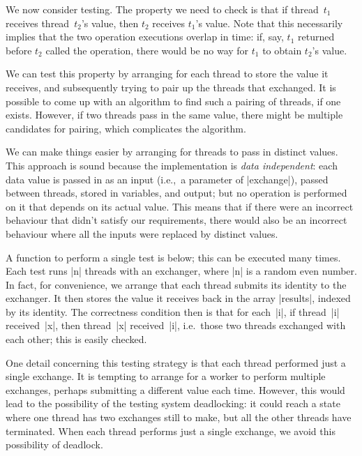 
We now consider testing.  The property we need to check is that if
thread~$t_1$ receives thread~$t_2$'s value, then $t_2$ receives $t_1$'s value.
Note that this necessarily implies that the two operation executions overlap
in time: if, say, $t_1$ returned before $t_2$ called the operation, there
would be no way for $t_1$ to obtain $t_2$'s value.  

We can test this property by arranging for each thread to store the value it
receives, and subsequently trying to pair up the threads that exchanged.  It
is possible to come up with an algorithm to find such a pairing of threads, if
one exists.
However, if two threads pass in the same value, there might be multiple
candidates for pairing, which complicates the algorithm.

We can make things easier by arranging for threads to pass in distinct values.
This approach is sound because the implementation is \emph{data independent}:
each data value is passed in as an input (i.e.,~a parameter of |exchange|),
passed between threads, stored in variables, and output; but no operation is
performed on it that depends on its actual value.  This means that if there
were an incorrect behaviour that didn't satisfy our requirements, there would
also be an incorrect behaviour where all the inputs were replaced by distinct
values.

A function to perform a single test is below; this can be executed many times.
Each test runs |n| threads with an exchanger, where |n| is a random even
number.  In fact, for convenience, we arrange that each thread submits its
identity to the exchanger.  It then stores the value it receives back in the
array |results|, indexed by its identity.  The correctness condition then is
that for each~|i|, if thread~|i| received~|x|, then thread~|x| received~|i|,
i.e.~those two threads exchanged with each other; this is easily checked.
%
%

One detail concerning this testing strategy is that each thread performed just
a single exchange.  It is tempting to arrange for a worker to perform multiple
exchanges, perhaps submitting a different value each time.  However, this would
lead to the possibility of the testing system deadlocking: it could reach a
state where one thread has two exchanges still to make, but all the other
threads have terminated.  When each thread performs just a single exchange, we
avoid this possibility of deadlock. 

